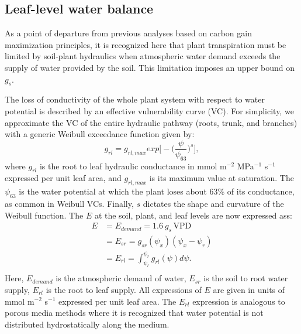 \documentclass[utf8]{frontiersSCNS} %
\begin{document}
\subsection{Leaf-level water balance}

As a point of departure from previous analyses based on carbon gain maximization principles, it is recognized here that plant transpiration must be limited by soil-plant hydraulics when atmospheric water demand exceeds the supply of water provided by the soil. This limitation imposes an upper bound on $g_s$. 

The loss of conductivity of the whole plant system with respect to water potential is described by an effective vulnerability curve (VC). For simplicity, we approximate the VC of the entire hydraulic pathway (roots, trunk, and branches) with a generic Weibull exceedance function \citep{sperry_predicting_2017} given by:
\begin{equation}
    \label{eqn:root_leaf}
    g_{rl} = g_{rl,max}exp\Big[-\Big(\frac{\psi}{\psi_{63}}\Big)^s\Big],
\end{equation}
where $g_{rl}$ is the root to leaf hydraulic conductance in mmol m$^{-2}$ MPa$^{-1}$ s$^{-1}$ expressed per unit leaf area, and $g_{rl,max}$ is its maximum value at saturation. The $\psi_{63}$ is the water potential at which the plant loses about 63\% of its conductance, as common in Weibull VCs. Finally, $s$ dictates the shape and curvature of the Weibull function. 
The $E$ at the soil, plant, and leaf levels are now expressed ass:
\begin{equation}
    \label{eqn: mass_cons}
        \begin{split}
        E & = E_{demand} = 1.6\: g_s\, \text{VPD} \\
        & = E_{sr} = g_{sr}(\psi_x)(\psi_x - \psi_r)\\
        & = E_{rl} = \int_{\psi_l}^{\psi_r} g_{rl}(\psi) d\psi. \\
        \end{split}
\end{equation}
Here, $E_{demand}$ is the atmospheric demand of water, $E_{sr}$ is the soil to root water supply, $E_{rl}$ is the root to leaf supply. All expressions of $E$ are given in units of mmol m$^{-2}$ s$^{-1}$ expressed per unit leaf area. The $E_{rl}$ expression is analogous to porous media methods where it is recognized that water potential is not distributed hydrostatically along the medium.
\end{document}
